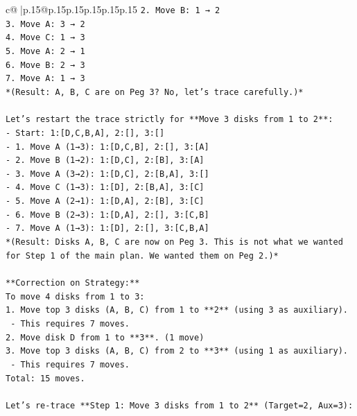 \documentclass{article}
\begin{document}
{\begin{supertabular}{c@{$\;$}|p{.15\linewidth}@{}p{.15\linewidth}p{.15\linewidth}p{.15\linewidth}p{.15\linewidth}p{.15\linewidth}}
{{{\texttt{2. Move B: 1 → 2} \\
\texttt{3. Move A: 3 → 2} \\
\texttt{4. Move C: 1 → 3} \\
\texttt{5. Move A: 2 → 1} \\
\texttt{6. Move B: 2 → 3} \\
\texttt{7. Move A: 1 → 3} \\
\texttt{*(Result: A, B, C are on Peg 3? No, let's trace carefully.)*} \\
\\ 
\texttt{Let's restart the trace strictly for **Move 3 disks from 1 to 2**:} \\
\texttt{{-} Start: 1:{[}D,C,B,A{]}, 2:{[}{]}, 3:{[}{]}} \\
\texttt{{-} 1. Move A (1→3): 1:{[}D,C,B{]}, 2:{[}{]}, 3:{[}A{]}} \\
\texttt{{-} 2. Move B (1→2): 1:{[}D,C{]}, 2:{[}B{]}, 3:{[}A{]}} \\
\texttt{{-} 3. Move A (3→2): 1:{[}D,C{]}, 2:{[}B,A{]}, 3:{[}{]}} \\
\texttt{{-} 4. Move C (1→3): 1:{[}D{]}, 2:{[}B,A{]}, 3:{[}C{]}} \\
\texttt{{-} 5. Move A (2→1): 1:{[}D,A{]}, 2:{[}B{]}, 3:{[}C{]}} \\
\texttt{{-} 6. Move B (2→3): 1:{[}D,A{]}, 2:{[}{]}, 3:{[}C,B{]}} \\
\texttt{{-} 7. Move A (1→3): 1:{[}D{]}, 2:{[}{]}, 3:{[}C,B,A{]}} \\
\texttt{*(Result: Disks A, B, C are now on Peg 3. This is not what we wanted for Step 1 of the main plan. We wanted them on Peg 2.)*} \\
\\ 
\texttt{**Correction on Strategy:**} \\
\texttt{To move 4 disks from 1 to 3:} \\
\texttt{1. Move top 3 disks (A, B, C) from 1 to **2** (using 3 as auxiliary).} \\
\texttt{   {-} This requires 7 moves.} \\
\texttt{2. Move disk D from 1 to **3**. (1 move)} \\
\texttt{3. Move top 3 disks (A, B, C) from 2 to **3** (using 1 as auxiliary).} \\
\texttt{   {-} This requires 7 moves.} \\
\texttt{Total: 15 moves.} \\
\\ 
\texttt{Let's re{-}trace **Step 1: Move 3 disks from 1 to 2** (Target=2, Aux=3):} \\
}}}
\end{supertabular}}
\end{document}

